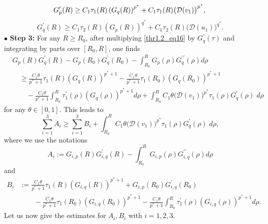 \documentclass[11pt,reqno]{amsart}
\numberwithin{equation}{section}
\begin{document}
\begin{equation}\label{thr1.2_eq16}
G_p^{\prime}(R)\geq C_1 \tau_1(R)\left(G_q(R)\right)^{p^*}+C_1\tau_1(R)\big(\mathcal{D}(v_1)\big)^{p^*}, \\
\end{equation}
\begin{equation}\label{thr1.2_eq17}
G_q^{\prime}(R) \geq C_1 \tau_2(R)\left(G_p(R)\right)^{q^*}+C_1\tau_2(R)\big(\mathcal{D}(u_1)\big)^{q^*}.
\end{equation}
$\bullet$ {\bf Step 3:} For any $R\geq R_0$, after multiplying \eqref{thr1.2_eq16} by $G_q^{\prime}(\tau)$ and integrating by parts over $\left[R_0, R\right]$, one finds
\begin{align*}
& G_p(R) G_q^{\prime}(R)-G_p\left(R_0\right) G_q^{\prime}\left(R_0\right)-\int^R_{R_0} G_p(\rho) G_q^{\prime \prime}(\rho) d \rho \\
&\quad \geq \frac{C_1\theta}{p^*+1} \tau_1(R)\left(G_q(R)\right)^{p^*+1}-\frac{C_1\theta}{p^*+1} \tau_1\left(R_0\right)\left(G_q\left(R_0\right)\right)^{p^*+1} \\
&\qquad -\frac{C_1\theta}{p^*+1} \int_{R_0}^R \tau_1^{\prime}(\rho)\left(G_q(\rho)\right)^{p^*+1} d \rho+\int_{R_0}^{R}C_1\theta\big(\mathcal{D}(v_1)\big)^{p^*}\tau_1(\rho)G^{\prime}_q(\rho)\;d\rho
\end{align*}
for any $\theta\in [0,1]$. This leads to 
\begin{equation}\label{thr1.2_eq18}
\sum_{i=1}^3A_i\geq \sum_{i=1}^3{B_i}+\int_{R_0}^{R} C_1\theta\big(\mathcal{D}(v_1)\big)^{p^*}\tau_1(\rho)G^{\prime}_q(\rho)\;d\rho,
\end{equation}
where we use the notations
\begin{equation}\label{thr1.2_eq19}
    A_i:=G_{i,p}(R)G^{\prime}_{i,q}(R)-\int^R_{R_0} G_{i,p}(\rho) G^{\prime \prime}_{i,q}(\rho) d \rho 
\end{equation}
and 
\begin{equation}\label{thr1.2_eq20}
\begin{aligned}
B_i &:=\frac{C_1\theta}{p^*+1} \tau_1(R)\left(G_{i,q}(R)\right)^{p^*+1}+G_{i,p}\left(R_0\right) G^{\prime}_{i,q}\left(R_0\right) \\
&\qquad -\frac{C_1\theta}{p^*+1} \tau_1\left(R_0\right)\left(G_{i,q}\left(R_0\right)\right)^{p^*+1} -\frac{C_1\theta}{p^*+1} \int_{R_0}^R \tau_1^{\prime}(\rho)\left(G_{i,q}(\rho)\right)^{p^*+1} d \rho.
\end{aligned}
\end{equation}
Let us now give the estimates for $A_i,B_i$ with $i=1,2,3$. \medskip
\end{document}
